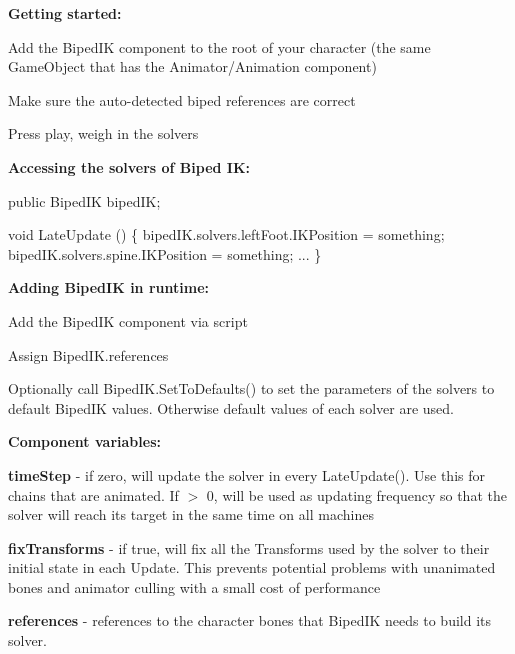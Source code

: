 {\bfseries Getting started\+:}
\begin{DoxyItemize}
\item Add the Biped\+IK component to the root of your character (the same Game\+Object that has the Animator/\+Animation component)
\item Make sure the auto-\/detected biped references are correct
\item Press play, weigh in the solvers
\end{DoxyItemize}

{\bfseries Accessing the solvers of Biped IK\+:}


\begin{DoxyCode}
\textcolor{keyword}{public} BipedIK bipedIK;

\textcolor{keywordtype}{void} LateUpdate () \{
    bipedIK.solvers.leftFoot.IKPosition = something;
    bipedIK.solvers.spine.IKPosition = something;
    ...
\}
\end{DoxyCode}


{\bfseries Adding Biped\+IK in runtime\+:}
\begin{DoxyItemize}
\item Add the Biped\+IK component via script
\item Assign Biped\+I\+K.\+references
\item Optionally call Biped\+I\+K.\+Set\+To\+Defaults() to set the parameters of the solvers to default Biped\+IK values. Otherwise default values of each solver are used.
\end{DoxyItemize}

{\bfseries Component variables\+:}
\begin{DoxyItemize}
\item {\bfseries time\+Step} -\/ if zero, will update the solver in every Late\+Update(). Use this for chains that are animated. If $>$ 0, will be used as updating frequency so that the solver will reach its target in the same time on all machines
\item {\bfseries fix\+Transforms} -\/ if true, will fix all the Transforms used by the solver to their initial state in each Update. This prevents potential problems with unanimated bones and animator culling with a small cost of performance
\item {\bfseries references} -\/ references to the character bones that Biped\+IK needs to build it\textquotesingle{}s solver.
\end{DoxyItemize}

